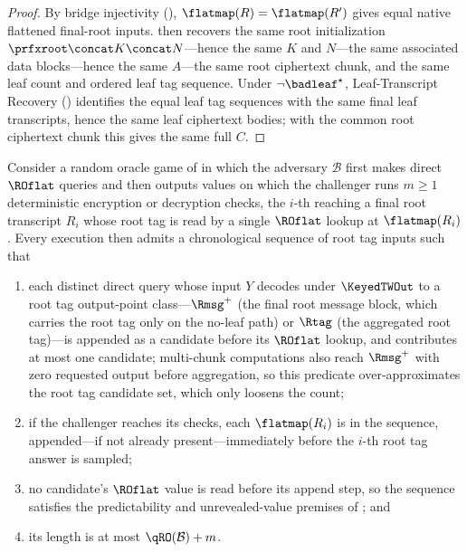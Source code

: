 \begin{proof}
By bridge injectivity (),
$\flatmap(R) = \flatmap(R')$ gives equal native flattened final-root
inputs.  then recovers the same root
initialization $\prfxroot \concat K \concat N$---hence the same $K$ and
$N$---the same associated data blocks---hence the same $A$---the same root
ciphertext chunk, and the same leaf count and ordered leaf tag sequence.
Under $\neg\badleaf^\star$, Leaf-Transcript Recovery
() identifies the equal leaf tag sequences with
the same final leaf transcripts, hence the same leaf ciphertext bodies;
with the common root ciphertext chunk this gives the same full $C$.
\end{proof}

\begin{lemma}
\label{lem:root-candidate-seq}
Consider a random oracle game of  in which the
adversary $\mathcal{B}$ first makes direct $\ROflat$ queries and then
outputs values on which the challenger runs $m \geq 1$ deterministic
encryption or decryption checks, the $i$-th reaching a final root transcript $R_i$
whose root tag is read by a single $\ROflat$ lookup at $\flatmap(R_i)$.
Every execution then admits a chronological sequence of root tag inputs
such that
\begin{enumerate}
\item each distinct direct query whose input $Y$ decodes under
  $\KeyedTWOut$ to a root tag output-point class---$\Rmsg^+$ (the final
  root message block, which carries the root tag only on the no-leaf path)
  or $\Rtag$ (the aggregated root tag)---is appended as a candidate before
  its $\ROflat$ lookup, and contributes at most one candidate; multi-chunk
  computations also reach $\Rmsg^+$ with zero requested output before
  aggregation, so this predicate over-approximates the root tag candidate
  set, which only loosens the count;
\item if the challenger reaches its checks, each $\flatmap(R_i)$ is in
  the sequence, appended---if not already present---immediately before
  the $i$-th root tag answer is sampled;
\item no candidate's $\ROflat$ value is read before its append step, so
  the sequence satisfies the predictability and unrevealed-value premises
  of ;
  and
\item its length is at most $\qRO(\mathcal{B}) + m$.
\end{enumerate}
\end{lemma}

